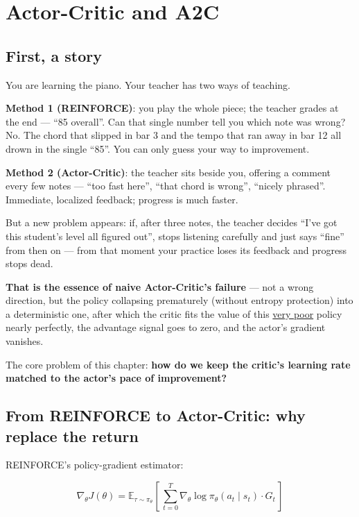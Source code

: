 \documentclass{article}
\begin{document}
\section*{Actor-Critic and A2C}

\subsection*{First, a story}

You are learning the piano. Your teacher has two ways of teaching.

\textbf{Method 1 (REINFORCE)}: you play the whole piece; the teacher grades at the end --- ``85 overall''. Can that single number tell you which note was wrong? No. The chord that slipped in bar 3 and the tempo that ran away in bar 12 all drown in the single ``85''. You can only guess your way to improvement.

\textbf{Method 2 (Actor-Critic)}: the teacher sits beside you, offering a comment every few notes --- ``too fast here'', ``that chord is wrong'', ``nicely phrased''. Immediate, localized feedback; progress is much faster.

But a new problem appears: if, after three notes, the teacher decides ``I've got this student's level all figured out'', stops listening carefully and just says ``fine'' from then on --- from that moment your practice loses its feedback and progress stops dead.

\textbf{That is the essence of naive Actor-Critic's failure} --- not a wrong direction, but the policy collapsing prematurely (without entropy protection) into a deterministic one, after which the critic fits the value of this \underline{very poor} policy nearly perfectly, the advantage signal goes to zero, and the actor's gradient vanishes.

The core problem of this chapter: \textbf{how do we keep the critic's learning rate matched to the actor's pace of improvement?}

\subsection*{From REINFORCE to Actor-Critic: why replace the return}

REINFORCE's policy-gradient estimator:

\[
\nabla_\theta J(\theta) = \mathbb{E}_{\tau \sim \pi_\theta}\!\left[\,\sum_{t=0}^{T}
\nabla_\theta \log \pi_\theta(a_t \mid s_t) \cdot G_t\,\right]
\]
\end{document}
